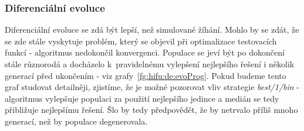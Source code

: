 \subsubsection{Diferenciální evoluce}
Diferenciální evoluce se zdá být lepší, než simulované žíhání. Mohlo by se zdát, že se zde stále vyskytuje problém, který se objevil při optimalizace testovacích funkcí - algoritmus nedokončil konvergenci. Populace se jeví být po dokončení stále různorodá a docházelo k~pravidelnému vylepšení nejlepšího řešení i několik generací před ukončením - viz grafy~\ref{fg:hifu:de:evoProg}. Pokud budeme tento graf studovat detailněji, zjistíme, že je možné pozorovat vliv strategie \emph{best/1/bin} - algoritmus vylepšuje populaci za použití nejlepšího jedince a medián se tedy přibližuje nejlepšímu řešení. Šlo by tedy předpovědět, že by netrvalo příliš mnoho generací, než by populace degenerovala.

